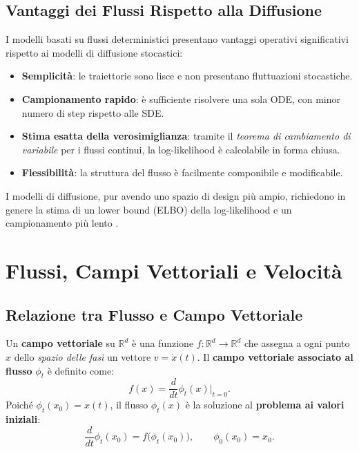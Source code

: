 \subsection{Vantaggi dei Flussi Rispetto alla Diffusione}
\label{subsec:fm-flow-advantages}

I modelli basati su flussi deterministici presentano vantaggi operativi
significativi rispetto ai modelli di diffusione stocastici:

\begin{itemize}
  \item \textbf{Semplicità}: le traiettorie sono lisce e non presentano
        fluttuazioni stocastiche.
  \item \textbf{Campionamento rapido}: è sufficiente risolvere una sola
        ODE, con minor numero di step rispetto alle SDE.
  \item \textbf{Stima esatta della verosimiglianza}: tramite il
        \emph{teorema di cambiamento di variabile} per i flussi continui,
        la log-likelihood è calcolabile in forma chiusa.
  \item \textbf{Flessibilità}: la struttura del flusso è facilmente
        componibile e modificabile.
\end{itemize}

I modelli di diffusione, pur avendo uno spazio di design più ampio,
richiedono in genere la stima di un lower bound (ELBO) della
log-likelihood e un campionamento più lento \citep{ho2020ddpm,bishop2024}.

\section{Flussi, Campi Vettoriali e Velocità}
\label{sec:fm-flows-velocity}

\subsection{Relazione tra Flusso e Campo Vettoriale}
\label{subsec:fm-flow-vector-field}

Un \textbf{campo vettoriale} su $\mathbb{R}^d$ è una funzione
$f : \mathbb{R}^d \to \mathbb{R}^d$ che assegna a ogni punto $x$ dello
\emph{spazio delle fasi} un vettore $v = \dot{x}(t)$. Il
\textbf{campo vettoriale associato al flusso} $\phi_t$ è definito come:
\begin{equation}
  f(x) = \frac{d}{dt}\phi_t(x)\bigg|_{t=0}.
\end{equation}
Poiché $\phi_t(x_0) = x(t)$, il flusso $\phi_t(x)$ è la soluzione al
\textbf{problema ai valori iniziali}:
\begin{equation}
  \frac{d}{dt}\phi_t(x_0) = f\bigl(\phi_t(x_0)\bigr), \qquad \phi_0(x_0) = x_0.
\end{equation}

